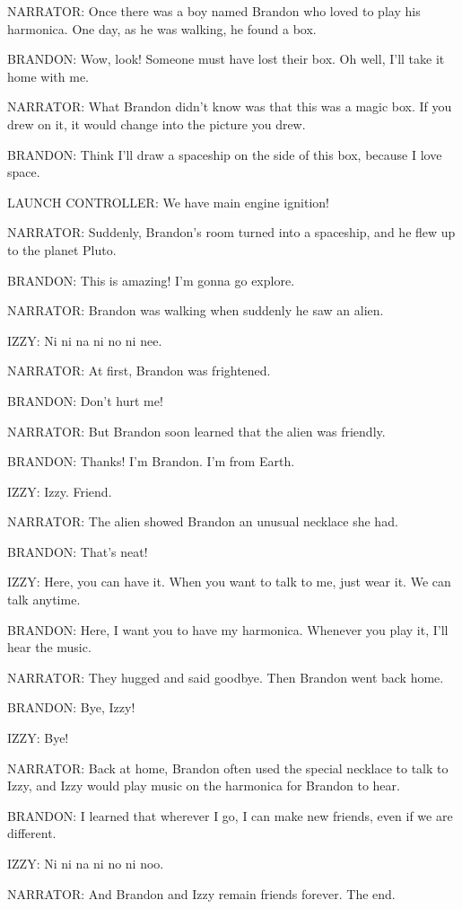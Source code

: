 NARRATOR:
Once there was a boy named Brandon who loved to play his harmonica.
One day, as he was walking, he found a box.

BRANDON:
Wow, look!
Someone must have lost their box.
Oh well, I'll take it home with me.

NARRATOR:
What Brandon didn't know was that this was a magic box.
If you drew on it, it would change into the picture you drew.

BRANDON:
Think I'll draw a spaceship on the side of this box, because I love space.

LAUNCH CONTROLLER:
We have main engine ignition!

NARRATOR:
Suddenly, Brandon's room turned into a spaceship, and he flew up to the planet Pluto.

BRANDON:
This is amazing! I'm gonna go explore.

NARRATOR:
Brandon was walking when suddenly he saw an alien.

IZZY:
Ni ni na ni no ni nee.

NARRATOR:
At first, Brandon was frightened.

BRANDON:
Don't hurt me!

NARRATOR:
But Brandon soon learned that the alien was friendly.

BRANDON:
Thanks! I'm Brandon.
I'm from Earth.

IZZY:
Izzy.
Friend.

NARRATOR:
The alien showed Brandon an unusual necklace she had.

BRANDON:
That's neat!

IZZY:
Here, you can have it.
When you want to talk to me, just wear it.
We can talk anytime.

BRANDON:
Here, I want you to have my harmonica.
Whenever you play it, I'll hear the music.

NARRATOR:
They hugged and said goodbye.
Then Brandon went back home.

BRANDON:
Bye, Izzy!

IZZY:
Bye!

NARRATOR:
Back at home, Brandon often used the special necklace to talk to Izzy, and Izzy would play music on the harmonica for Brandon to hear.

BRANDON:
I learned that wherever I go, I can make new friends, even if we are different.

IZZY:
Ni ni na ni no ni noo.

NARRATOR:
And Brandon and Izzy remain friends forever.
The end.


